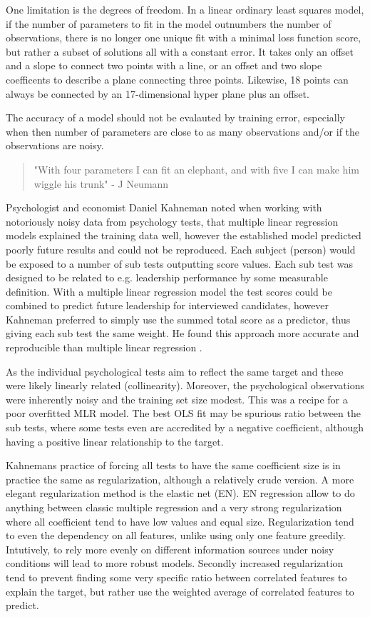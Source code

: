 One limitation is the degrees of freedom. In a linear ordinary least squares model, if the number of parameters to fit in the model outnumbers the number of observations, there is no longer one unique fit with a minimal loss function score, but rather a subset of solutions all with a constant error. It takes only an offset and a slope to connect two points with a line, or an offset and two slope coefficents to describe a plane connecting three points. Likewise, 18 points can always be connected by an 17-dimensional hyper plane plus an offset.

The accuracy of a model should not be evalauted by training error, especially when then number of parameters are close to as many observations and/or if the observations are noisy.

\begin{quotation}
"With four parameters I can fit an elephant, and with five I can make him wiggle his trunk"  - J Neumann
\cite{wiki2016John}
\end{quotation}

Psychologist and economist Daniel Kahneman noted when working with notoriously noisy data from psychology tests, that multiple linear regression models explained the training data well, however the established model predicted poorly future results and could not be reproduced.
Each subject (person) would be exposed to a number of sub tests outputting score values. Each sub test was designed to be related to e.g. leadership performance by some measurable definition. With a multiple linear regression model the test scores could be combined to predict future leadership for interviewed candidates, however Kahneman preferred to simply use the summed total score as a predictor, thus giving each sub test the same weight. He found this approach more accurate and reproducible than multiple linear regression \cite{kahneman2011thinking}.

As the individual psychological tests aim to reflect the same target and these were likely linearly related (collinearity). Moreover, the psychological observations were inherently noisy and the training set size modest. This was a recipe for a poor overfitted MLR model. The best OLS fit may be spurious ratio between the sub tests, where some tests even are accredited by a negative coefficient, although having a positive linear relationship to the target.

Kahnemans practice of forcing all tests to have the same coefficient size is in practice the same as regularization, although a relatively crude version. A more elegant regularization method is the elastic net (EN). EN regression allow to do anything between classic multiple regression and a very strong regularization where all coefficient tend to have low values and equal size. Regularization tend to even the dependency on all features, unlike using only one feature greedily. Intutively, to rely more evenly on different information sources under noisy conditions will lead to more robust models. Secondly increased regularization tend to prevent finding some very specific ratio between correlated features to explain the target, but rather use the weighted average of correlated features to predict.

